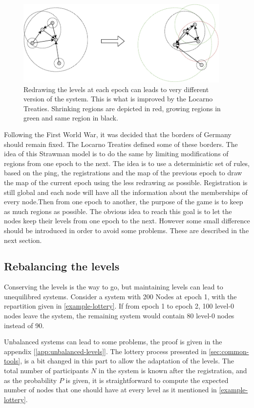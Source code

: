 \documentclass[a4paper,11pt,oneside]{report}
\begin{document}
\begin{figure}[!h] 
\centering
\includegraphics[width=300pt]{figures/LocarnoTreaties-Redrawing}
\caption{Redrawing the levels at each epoch can leads to very different version
    of the system. This is what is improved by the Locarno Treaties. Shrinking
    regions are depicted in red, growing regions in green and same region in
    black.} \label{fig:LocarnoTreaties-Redrawing}
\end{figure}

Following the First World War, it was decided that the borders of Germany
should remain fixed. The Locarno Treaties defined some of these borders. The
idea of this Strawman model is to do the same by limiting modifications of
regions from one epoch to the next. The idea is to use a deterministic set of
rules, based on the ping, the registrations and the map of the previous epoch
to draw the map of the current epoch using the less redrawing as possible.
Registration is still global and each node will have all the information about
the memberships of every node.Then from one epoch to another, the purpose of
the game is to keep as much regions as possible. The obvious idea to reach this
goal is to let the nodes keep their levels from one epoch to the next.  However
some small difference should be introduced in order to avoid some problems.
These are described in the next section.

\subsection{Rebalancing the levels} \label{rebalancing}
Conserving the levels is the way to go, but maintaining levels can lead to
unequilibred systems. Consider a system with 200 Nodes at epoch 1, with the
repartition given in \autoref{example-lottery}. If from epoch 1 to epoch 2,
100 level-0 nodes leave the system, the remaining system would contain 80
level-0 nodes instead of 90. 

Unbalanced systems can lead to some problems, the proof is given in the
appendix [\autoref{app:unbalanced-levels}]. The lottery process presented in
\autoref{sec:common-tools}, is a bit changed in this part to allow the
adaptation of the levels. The total number of participants $N$ in the system is
known after the registration, and as the probability $P$ is given, it is
straightforward to compute the expected number of nodes that one should have at
every level as it mentioned in \autoref{example-lottery}. 
\end{document}
